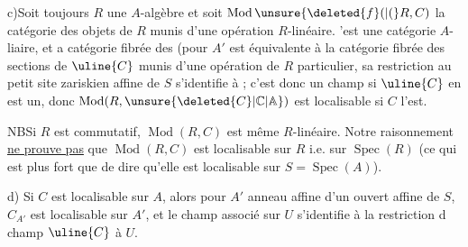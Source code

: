 c)\quad Soit toujours $R$ une $A$-algèbre et soit $\operatorname{Mod}\unsure{\deleted{f}(|(}R,C)$ la catégorie des objets de $R$ munis d'une opération $R$-linéaire. 'est une catégorie $A$-liaire, et a catégorie fibrée des
(pour $A'$   est équivalente à la catégorie fibrée des sections de $\uline{C}$ munis d'une opération de $R$  particulier, sa restriction au  petit site zariskien affine de $S$  s'identifie à
; c'est donc un champ si $\uline{C}$ en est un, donc $\operatorname{Mod}(R,\unsure{\deleted{C}|\mathbb{C}|\mathbb{A}})$ est localisable  si $C$ l'est.

NB\quad Si $R$ est commutatif, $\operatorname{Mod}(R,C)$ est même $R$-linéaire. Notre raisonnement \uline{ne prouve pas} que  $\operatorname{Mod}(R,C)$ est localisable sur $R$ i.e. sur $\operatorname{Spec}(R)$ (ce qui est plus fort que de dire qu'elle est localisable sur $S=\operatorname{Spec}(A)$).

d)\quad {} Si $C$ est localisable sur $A$, alors pour $A'$  anneau affine d'un ouvert affine  de $S$, $C_{A'}$ est localisable sur $A'$, et le champ associé sur $U$ s'identifie à la restriction d champ $\uline{C}$ à $U$.


